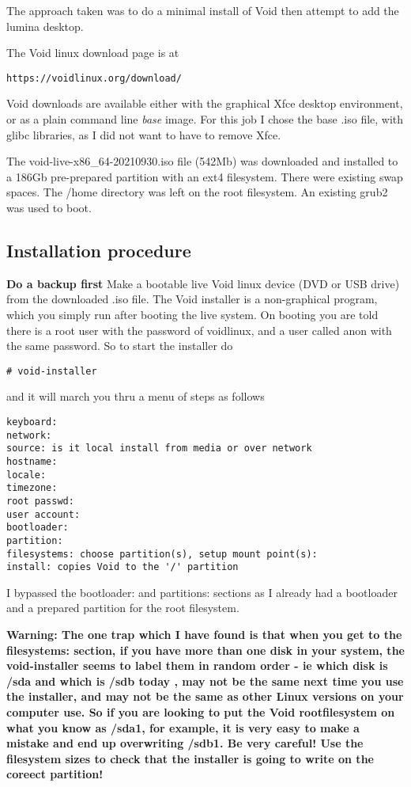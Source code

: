 \documentclass{article}  %
\begin{document}
The approach taken was to  do a minimal install of Void then attempt to add the lumina desktop.

The Void linux download page is at
\begin{verbatim}
https://voidlinux.org/download/
\end{verbatim}
Void downloads are available either with the graphical Xfce desktop environment, or as a plain command line {\em base} image. For this job I chose the base .iso file, with glibc libraries, as I did not want to have to remove Xfce.

The void-live-x86\_64-20210930.iso file (542Mb) was downloaded and installed to a 186Gb pre-prepared partition with an ext4 filesystem. There were existing swap spaces. The /home directory was left on the root filesystem. An existing grub2 was used to boot.
\subsection{Installation procedure}
{\bf Do a backup first}
Make a bootable live Void linux device (DVD or USB drive) from the downloaded .iso file.
The Void installer is a non-graphical program, which you simply run after booting the live system. On booting you are told there is a root user with the password of voidlinux, and a user called anon with the same password. So to start the installer do
\begin{verbatim}
# void-installer
\end{verbatim}
and it will march you thru a menu of steps as follows
\begin{verbatim}
keyboard:
network:
source: is it local install from media or over network
hostname:
locale:
timezone:
root passwd:
user account:
bootloader:
partition:
filesystems: choose partition(s), setup mount point(s):
install: copies Void to the '/' partition
\end{verbatim}
I bypassed the bootloader: and partitions: sections as I already had a bootloader and a prepared partition for the root filesystem. 

{\bf Warning: The one trap which I have found is that when you get to the filesystems: section, if you have more than one disk in your system, the void-installer seems to label them in random order - ie which disk is /sda and which is /sdb today , may not be the same next time you use the installer, and may not be the same as other Linux versions on your computer use. So if you are looking to put the Void rootfilesystem on what you know as /sda1, for example, it is very easy to make a mistake and end up overwriting /sdb1. Be very careful!  Use the filesystem sizes to check that the installer is going to write on the coreect partition! }
\end{document}
